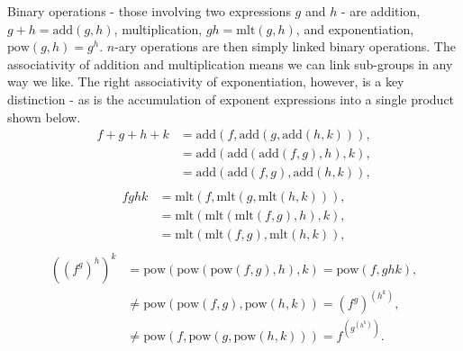 \documentclass[10pt]{article}
\newcommand{\mlt}{\mathrm{mlt}}
\newcommand{\add}{\mathrm{add}}
\newcommand{\pow}{\mathrm{pow}}
\begin{document}
Binary operations - those involving two expressions $g$ and $h$ - are addition, $g+h=\add(g,h)$, multiplication, $gh=\mlt(g,h)$, and exponentiation, $\pow(g,h)=g^h$.
$n$-ary operations are then simply linked binary operations.
The associativity of addition and multiplication means we can link sub-groups in any way we like.
The right associativity of exponentiation, however, is a key distinction - as is the accumulation of exponent expressions into a single product shown below.
\begin{equation}
	\begin{aligned}
		f+g+h+k &= \add(f,\add(g, \add(h, k))), \\
				&= \add(\add(\add(f, g), h), k), \\
				&= \add(\add(f, g), \add(h, k)), \\
	\end{aligned}
	\label{eqn: nary add}
\end{equation}
\begin{equation}
	\begin{aligned}
		fghk &= \mlt(f,\mlt(g, \mlt(h, k))), \\
			 &= \mlt(\mlt(\mlt(f, g), h), k), \\
			 &= \mlt(\mlt(f, g), \mlt(h, k)), \\
	\end{aligned}
	\label{eqn: nary mlt}
\end{equation}
\begin{equation}
	\begin{aligned}
		((f^g)^h)^k &= \pow(\pow(\pow(f, g), h), k) = \pow(f, ghk), \\
					&\neq \pow(\pow(f, g), \pow(h, k)) = (f^g)^{(h^k)}, \\
					&\neq \pow(f, \pow(g, \pow(h, k))) = f^{(g^{(h^k)})}.
	\end{aligned}
\end{equation}
\end{document}
